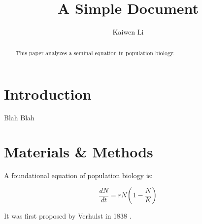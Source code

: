 \documentclass[12pt]{article}
\title{A Simple Document}
\author{Kaiwen Li}
\date{}
\begin{document}
\maketitle

\begin{abstract}
    This paper analyzes a seminal equation in population biology.
\end{abstract}

\section{Introduction}
Blah Blah

\section{Materials & Methods}
A foundational equation of population biology is:

\begin{equation}
    \frac{dN}{dt} = r N (1 - \frac{N}{K})
\end{equation}

It was first proposed by Verhulst in 1838 \cite{verhulst1838notice}.




\end{document}
